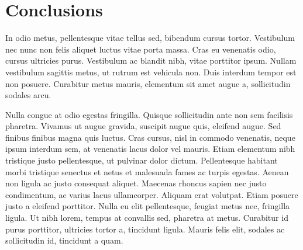 \chapter{Conclusions}
\label{chap-conclusion}
In odio metus, pellentesque vitae tellus sed, bibendum cursus tortor. Vestibulum nec nunc non felis aliquet luctus vitae porta massa. Cras eu venenatis odio, cursus ultricies purus. Vestibulum ac blandit nibh, vitae porttitor ipsum. Nullam vestibulum sagittis metus, ut rutrum est vehicula non. Duis interdum tempor est non posuere. Curabitur metus mauris, elementum sit amet augue a, sollicitudin sodales arcu.

Nulla congue at odio egestas fringilla. Quisque sollicitudin ante non sem facilisis pharetra. Vivamus ut augue gravida, suscipit augue quis, eleifend augue. Sed finibus finibus magna quis luctus. Cras cursus, nisl in commodo venenatis, neque ipsum interdum sem, at venenatis lacus dolor vel mauris. Etiam elementum nibh tristique justo pellentesque, ut pulvinar dolor dictum. Pellentesque habitant morbi tristique senectus et netus et malesuada fames ac turpis egestas. Aenean non ligula ac justo consequat aliquet. Maecenas rhoncus sapien nec justo condimentum, ac varius lacus ullamcorper. Aliquam erat volutpat. Etiam posuere justo a eleifend porttitor. Nulla eu elit pellentesque, feugiat metus nec, fringilla ligula. Ut nibh lorem, tempus at convallis sed, pharetra at metus. Curabitur id purus porttitor, ultricies tortor a, tincidunt ligula. Mauris felis elit, sodales ac sollicitudin id, tincidunt a quam.
